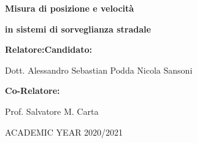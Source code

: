 \vspace{7em}

\noindent
\begin{center}
    \textbf{\Large Misura di posizione e velocità}\par
    \vspace{0.6em}
    \textbf{\Large in sistemi di sorveglianza stradale}\par
\end{center}{\LARGE \par}

\vspace{4cm}
\textbf{\large Relatore:}{\large \hfill{}}\textbf{\large Candidato:}{\large \par}

{\large Dott. Alessandro Sebastian Podda \hfill{}Nicola Sansoni~}{\large \par}
\vspace{1cm}
\textbf{\large Co-Relatore:}{\large \par}
{\large Prof. Salvatore M. Carta}

\vspace{2cm}

\begin{center}
    {\large ACADEMIC YEAR 2020/2021}{\large \par}
\end{center}
